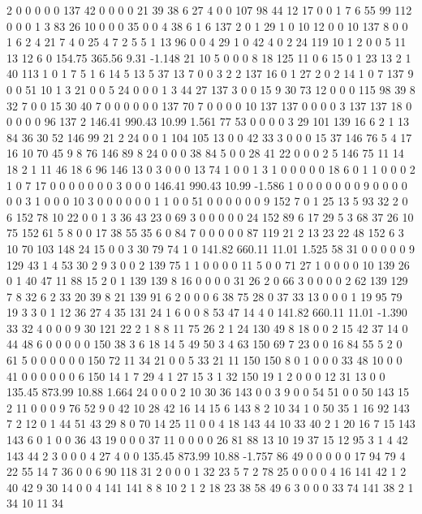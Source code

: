  2 0 0 0 0 0 137 42 0 0 0 0 21 39 38 6 27 4 0 0
 107 98 44 12 17 0 0 1 7 6 55 99 112 0 0 0 1 3 83 26
 10 0 0 0 35 0 0 4 38 6 1 6 137 2 0 1 29 1 0 10
 12 0 0 10 137 8 0 0 1 6 2 4 21 7 4 0 25 4 7 2
 5 5 1 13 96 0 0 4 29 1 0 42 4 0 2 24 119 10 1 2
 0 0 5 11 13 12 6 0
154.75 365.56 9.31 -1.148
 21 10 5 0 0 0 8 18 125 11 0 6 15 0 1 23 13 2 1 40
 113 1 0 1 7 5 1 6 14 5 13 5 37 13 7 0 0 3 2 2
 137 16 0 1 27 2 0 2 14 1 0 7 137 9 0 0 51 10 1 3
 21 0 0 5 24 0 0 0 1 3 44 27 137 3 0 0 15 9 30 73
 12 0 0 0 115 98 39 8 32 7 0 0 15 30 40 7 0 0 0 0
 0 0 137 70 7 0 0 0 0 10 137 137 0 0 0 0 3 137 137 18
 0 0 0 0 0 96 137 2
146.41 990.43 10.99 1.561
 77 53 0 0 0 0 3 29 101 139 16 6 2 1 13 84 36 30 52 146
 99 21 2 24 0 0 1 104 105 13 0 0 42 33 3 0 0 0 15 37
 146 76 5 4 17 16 10 70 45 9 8 76 146 89 8 24 0 0 0 38
 84 5 0 0 28 41 22 0 0 0 2 5 146 75 11 14 18 2 1 11
 46 18 6 96 146 13 0 3 0 0 0 13 74 1 0 0 1 3 1 0
 0 0 0 0 18 6 0 1 1 0 0 0 2 1 0 7 17 0 0 0
 0 0 0 0 3 0 0 0
146.41 990.43 10.99 -1.586
 1 0 0 0 0 0 0 0 9 0 0 0 0 0 0 3 1 0 0 0
 10 3 0 0 0 0 0 0 1 1 0 0 51 0 0 0 0 0 0 9
 152 7 0 1 25 13 5 93 32 2 0 6 152 78 10 22 0 0 1 3
 36 43 23 0 69 3 0 0 0 0 0 24 152 89 6 17 29 5 3 68
 37 26 10 75 152 61 5 8 0 0 17 38 55 35 6 0 84 7 0 0
 0 0 0 87 119 21 2 13 23 22 48 152 6 3 10 70 103 148 24 15
 0 0 3 30 79 74 1 0
141.82 660.11 11.01 1.525
 58 31 0 0 0 0 0 9 129 43 1 4 53 30 2 9 3 0 0 2
 139 75 1 1 0 0 0 0 11 5 0 0 71 27 1 0 0 0 0 10
 139 26 0 1 40 47 11 88 15 2 0 1 139 139 8 16 0 0 0 0
 31 26 2 0 66 3 0 0 0 0 2 62 139 129 7 8 32 6 2 33
 20 39 8 21 139 91 6 2 0 0 0 6 38 75 28 0 37 33 13 0
 0 0 1 19 95 79 19 3 3 0 1 12 36 27 4 35 131 24 1 6
 0 0 8 53 47 14 4 0
141.82 660.11 11.01 -1.390
 33 32 4 0 0 0 9 30 121 22 2 1 8 8 11 75 26 2 1 24
 130 49 8 18 0 0 2 15 42 37 14 0 44 48 6 0 0 0 0 0
 150 38 3 6 18 14 5 49 50 3 4 63 150 69 7 23 0 0 16 84
 55 5 2 0 61 5 0 0 0 0 0 0 150 72 11 34 21 0 0 5
 33 21 11 150 150 8 0 1 0 0 0 33 48 10 0 0 41 0 0 0
 0 0 0 6 150 14 1 7 29 4 1 27 15 3 1 32 150 19 1 2
 0 0 0 12 31 13 0 0
135.45 873.99 10.88 1.664
 24 0 0 0 2 10 30 36 143 0 0 3 9 0 0 54 51 0 0 50
 143 15 2 11 0 0 0 9 76 52 9 0 42 10 28 42 16 14 15 6
 143 8 2 10 34 1 0 50 35 1 16 92 143 7 2 12 0 1 44 51
 43 29 8 0 70 14 25 11 0 0 4 18 143 44 10 33 40 2 1 20
 16 7 15 143 143 6 0 1 0 0 36 43 19 0 0 0 37 11 0 0
 0 0 26 81 88 13 10 19 37 15 12 95 3 1 4 42 143 44 2 3
 0 0 0 4 27 4 0 0
135.45 873.99 10.88 -1.757
 86 49 0 0 0 0 0 17 94 79 4 22 55 14 7 36 0 0 6 90
 118 31 2 0 0 0 1 32 23 5 7 2 78 25 0 0 0 0 4 16
 141 42 1 2 40 42 9 30 14 0 0 4 141 141 8 8 10 2 1 2
 18 23 38 58 49 6 3 0 0 0 33 74 141 38 2 1 34 10 11 34
